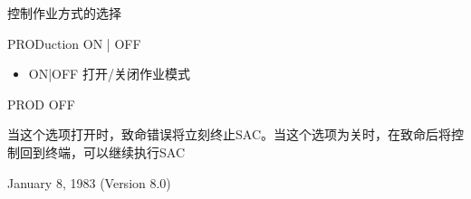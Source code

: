 \label{cmd:production}

控制作业方式的选择

PRODuction ON | OFF

\begin{itemize}
\item ON|OFF 打开/关闭作业模式
\end{itemize}

PROD OFF

当这个选项打开时，致命错误将立刻终止SAC。当这个选项为关时，在致命后将控制回到终端，可以继续执行SAC

January 8, 1983 (Version 8.0)
